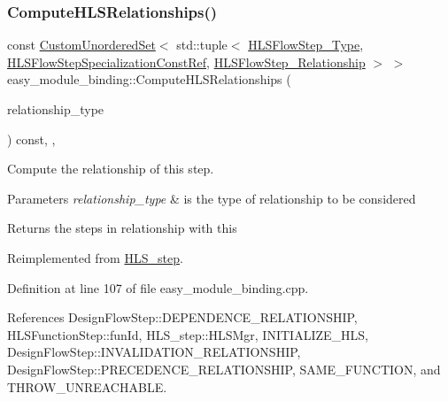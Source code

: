 \subsubsection{\texorpdfstring{Compute\+H\+L\+S\+Relationships()}{ComputeHLSRelationships()}}
{\footnotesize\ttfamily const \hyperlink{classCustomUnorderedSet}{Custom\+Unordered\+Set}$<$ std\+::tuple$<$ \hyperlink{hls__step_8hpp_ada16bc22905016180e26fc7e39537f8d}{H\+L\+S\+Flow\+Step\+\_\+\+Type}, \hyperlink{hls__step_8hpp_a5fdd2edf290c196531d21d68e13f0e74}{H\+L\+S\+Flow\+Step\+Specialization\+Const\+Ref}, \hyperlink{hls__step_8hpp_a3ad360b9b11e6bf0683d5562a0ceb169}{H\+L\+S\+Flow\+Step\+\_\+\+Relationship} $>$ $>$ easy\+\_\+module\+\_\+binding\+::\+Compute\+H\+L\+S\+Relationships (\begin{DoxyParamCaption}\item[{const \hyperlink{classDesignFlowStep_a723a3baf19ff2ceb77bc13e099d0b1b7}{Design\+Flow\+Step\+::\+Relationship\+Type}}]{relationship\+\_\+type }\end{DoxyParamCaption}) const\hspace{0.3cm}{\ttfamily [override]}, {\ttfamily [protected]}, {\ttfamily [virtual]}}



Compute the relationship of this step. 


\begin{DoxyParams}{Parameters}
{\em relationship\+\_\+type} & is the type of relationship to be considered \\
\hline
\end{DoxyParams}
\begin{DoxyReturn}{Returns}
the steps in relationship with this 
\end{DoxyReturn}


Reimplemented from \hyperlink{classHLS__step_aed0ce8cca9a1ef18e705fc1032ad4de5}{H\+L\+S\+\_\+step}.



Definition at line 107 of file easy\+\_\+module\+\_\+binding.\+cpp.



References Design\+Flow\+Step\+::\+D\+E\+P\+E\+N\+D\+E\+N\+C\+E\+\_\+\+R\+E\+L\+A\+T\+I\+O\+N\+S\+H\+IP, H\+L\+S\+Function\+Step\+::fun\+Id, H\+L\+S\+\_\+step\+::\+H\+L\+S\+Mgr, I\+N\+I\+T\+I\+A\+L\+I\+Z\+E\+\_\+\+H\+LS, Design\+Flow\+Step\+::\+I\+N\+V\+A\+L\+I\+D\+A\+T\+I\+O\+N\+\_\+\+R\+E\+L\+A\+T\+I\+O\+N\+S\+H\+IP, Design\+Flow\+Step\+::\+P\+R\+E\+C\+E\+D\+E\+N\+C\+E\+\_\+\+R\+E\+L\+A\+T\+I\+O\+N\+S\+H\+IP, S\+A\+M\+E\+\_\+\+F\+U\+N\+C\+T\+I\+ON, and T\+H\+R\+O\+W\+\_\+\+U\+N\+R\+E\+A\+C\+H\+A\+B\+LE.

